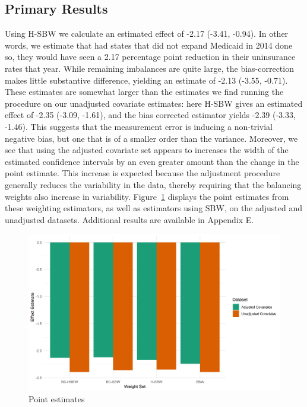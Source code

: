 \documentclass[aoas]{imsart}
\theoremstyle{plain}
\theoremstyle{remark}
\begin{document}
\subsection{Primary Results}

Using H-SBW we calculate an estimated effect of -2.17 (-3.41, -0.94). In other words, we estimate that had states that did not expand Medicaid in 2014 done so, they would have seen a 2.17 percentage point reduction in their uninsurance rates that year. While remaining imbalances are quite large, the bias-correction makes little substantive difference, yielding an estimate of -2.13 (-3.55, -0.71). These estimates are somewhat larger than the estimates we find running the procedure on our unadjusted covariate estimates: here H-SBW gives an estimated effect of -2.35 (-3.09, -1.61), and the bias corrected estimator yields -2.39 (-3.33, -1.46). This suggests that the measurement error is inducing a non-trivial negative bias, but one that is of a smaller order than the variance. Moreover, we see that using the adjusted covariate set appears to increases the width of the estimated confidence intervals by an even greater amount than the change in the point estimate. This increase is expected because the adjustment procedure generally reduces the variability in the data, thereby requiring that the balancing weights also increase in variability. Figure~\ref{fig:estimators} displays the point estimates from these weighting estimators, as well as estimators using SBW, on the adjusted and unadjusted datasets. Additional results are available in Appendix E.

\begin{figure}[H]
\begin{center}
    \caption{Point estimates}
    \label{fig:estimators}
    \includegraphics[scale=0.6]{01_Plots/point-estimates-c1.png}
\end{center}
\end{figure}
\end{document}
